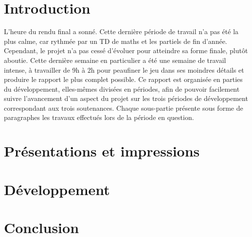 \documentclass[french]{article}
\begin{document}


\tableofcontents
\vspace{2cm}

\pagestyle{fancy}

\section{Introduction}

L'heure du rendu final a sonné. Cette dernière période de travail n'a pas été la plus calme, car rythmée par un TD de maths et les partiels de fin d'année.
Cependant, le projet n'a pas cessé d'évoluer pour atteindre sa forme finale, plutôt aboutie. Cette dernière semaine en particulier a été une semaine 
de travail intense, à travailler de 9h à 2h pour peaufiner le jeu dans ses moindres détails et produire le rapport le plus complet possible.
Ce rapport est organisée en parties du développement, elles-mêmes divisées en périodes, afin de pouvoir facilement suivre l'avancement d'un 
aspect du projet sur les trois périodes de développement correspondant aux trois soutenances. Chaque sous-partie présente sous forme de paragraphes 
les travaux effectués lors de la période en question.

\newpage
\section{Présentations et impressions}



\section{Développement}












\newpage

\section{Conclusion}
\end{document}
